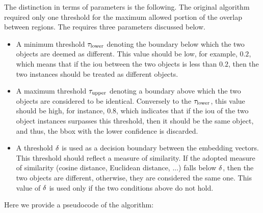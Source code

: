 The distinction in terms of parameters is the following. The original algorithm required only one threshold for the maximum allowed portion of the overlap between regions. The \featurenms{} requires three parameters discussed below.
\begin{itemize}
    \item A minimum threshold $\tau_{\text{lower}}$ denoting the boundary below which the two objects are deemed as different. This value should be low, for example, $0.2$, which means that if the \gls{iou} between the two objects is less than $0.2$, then the two instances should be treated as different objects.
    \item A maximum threshold $\tau_{\text{upper}}$ denoting a boundary above which the two objects are considered to be identical. Conversely to the $\tau_{\text{lower}}$, this value should be high, for instance, $0.8$, which indicates that if the \gls{iou} of the two object instances surpasses this threshold, then it should be the same object, and thus, the \gls{bbox} with the lower confidence is discarded.
    \item A threshold $\delta$ is used as a decision boundary between the embedding vectors. This threshold should reflect a measure of similarity. If the adopted measure of similarity (cosine distance, Euclidean distance, ...) falls below $\delta$, then the two objects are different, otherwise, they are considered the same one. This value of $\delta$ is used only if the two conditions above do not hold.
\end{itemize}

Here we provide a pseudocode of the \featurenms{} algorithm:

